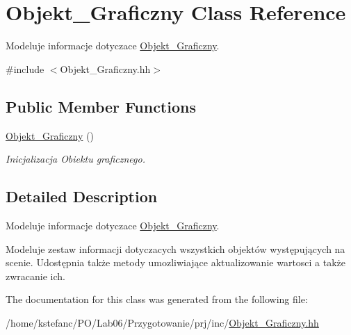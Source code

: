 \hypertarget{class_objekt___graficzny}{\section{Objekt\+\_\+\+Graficzny Class Reference}
\label{class_objekt___graficzny}
}


Modeluje informacje dotyczace \hyperlink{class_objekt___graficzny}{Objekt\+\_\+\+Graficzny}.  




{\ttfamily \#include $<$Objekt\+\_\+\+Graficzny.\+hh$>$}

\subsection*{Public Member Functions}
\begin{DoxyCompactItemize}
\item 
\hypertarget{class_objekt___graficzny_a77cf5352485959ba5b511e6241080e1c}{\hyperlink{class_objekt___graficzny_a77cf5352485959ba5b511e6241080e1c}{Objekt\+\_\+\+Graficzny} ()}\label{class_objekt___graficzny_a77cf5352485959ba5b511e6241080e1c}

\begin{DoxyCompactList}\small\item\em Inicjalizacja Obiektu graficznego. \end{DoxyCompactList}\end{DoxyCompactItemize}


\subsection{Detailed Description}
Modeluje informacje dotyczace \hyperlink{class_objekt___graficzny}{Objekt\+\_\+\+Graficzny}. 

Modeluje zestaw informacji dotyczacych wszystkich objektów występujących na scenie. Udostępnia także metody umozliwiające aktualizowanie wartosci a także zwracanie ich. 

The documentation for this class was generated from the following file\+:\begin{DoxyCompactItemize}
\item 
/home/kstefanc/\+P\+O/\+Lab06/\+Przygotowanie/prj/inc/\hyperlink{_objekt___graficzny_8hh}{Objekt\+\_\+\+Graficzny.\+hh}\end{DoxyCompactItemize}
